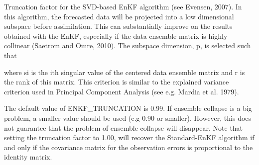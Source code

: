 \documentclass[letterpaper,10pt,english]{sphinxmanual}
\begin{document}
\begin{sphinxShadowBox}

Truncation factor for the SVD-based EnKF algorithm (see Evensen, 2007). In
this algorithm, the forecasted data will be projected into a low dimensional
subspace before assimilation. This can substantially improve on the results
obtained with the EnKF, especially if the data ensemble matrix is highly
collinear (Saetrom and Omre, 2010). The subspace dimension, p, is selected
such that

%
\begin{sphinxVerbatim}[commandchars=\\\{\}]
\PYGZbs{}\PYGZbs{} \PYGZbs{}  \PYGZbs{} \PYGZbs{}\PYGZbs{}
\end{sphinxVerbatim}

where si is the ith singular value of the centered data ensemble matrix and r
is the rank of this matrix. This criterion is similar to the explained
variance criterion used in Principal Component Analysis (see e.g. Mardia et
al. 1979).

The default value of ENKF\_TRUNCATION is 0.99. If ensemble collapse is a big
problem, a smaller value should be used (e.g 0.90 or smaller). However, this
does not guarantee that the problem of ensemble collapse will disappear. Note
that setting the truncation factor to 1.00, will recover the Standard-EnKF
algorithm if and only if the covariance matrix for the observation errors is
proportional to the identity matrix.
\end{sphinxShadowBox}
\label{\detokenize{keywords/index:std-scale-correlated-obs}}
\end{document}
